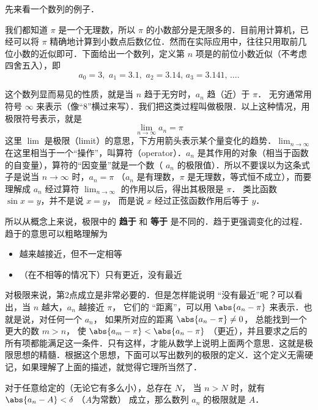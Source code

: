 
先来看一个数列的例子．

\begin{exam}{}
我们都知道 $\pi$ 是一个无理数，所以 $\pi$ 的小数部分是无限多的．目前用计算机，已经可以将 $\pi$ 精确地计算到小数点后数亿位．然而在实际应用中，往往只用取前几位小数的近似即可．下面给出一个数列，定义第 $n$ 项是的前位小数近似（不考虑四舍五入），即
\begin{equation}
{a_0} = 3,\,\,{a_1} = 3.1,\,\,{a_2} = 3.14,\,{a_3} = 3.141,\,\dots.
\end{equation}
\end{exam}

这个数列显而易见的性质，就是当 $n$ 趋于无穷时，$a_n$ 趋（近）于 $\pi$． 无穷通常用符号 $\infty$ 来表示（像“8”横过来写）．我们把这类过程叫做极限．以上这种情况，用极限符号表示，就是
\begin{equation}
\lim_{n \to \infty } {a_n} = \pi 
\end{equation}
这里 $\lim$ 是极限（limit）的意思，下方用箭头表示某个量变化的趋势．$\lim_{n \to \infty }$ 在这里相当于一个“操作”，叫算符（operator）．$a_n$ 是其作用的对象（相当于函数的自变量），算符的“因变量”就是一个数（ $a_n$ 的极限值）．所以不要误以为这条式子是说当 $n \to \infty$ 时，$a_n=\pi$ （$a_n$ 是有理数，$\pi$ 是无理数，等式恒不成立），而要理解成 $a_n$ 经过算符 $\lim_{n \to \infty }$ 的作用以后，得出其极限是 $\pi$． 类比函数 $\sin x = y$，并不是说 $x=y$， 而是说 $x$ 经过正弦函数作用后等于 $y$． 

所以从概念上来说，极限中的 \textbf{趋于} 和 \textbf{等于} 是不同的．趋于更强调变化的过程．趋于的意思可以粗略理解为
\begin{itemize}
\item 越来越接近，但不一定相等
\item （在不相等的情况下）只有更近，没有最近
\end{itemize}

对极限来说，第2点成立是非常必要的．但是怎样能说明 “没有最近”呢？可以看出，当 $n$ 越大，$a_n$ 越接近 $\pi$， 它们的 “距离”，可以用 $\abs{a_n - \pi}$ 来表示．也就是说，对任何一个 $a_n$， 如果所对应的距离 $\abs{a_n - \pi } \ne 0$， 总能找到一个更大的数 $m>n$， 使 $\abs{a_m - \pi} < \abs{a_n - \pi}$ （更近），并且要求之后的所有项都能满足这一条件．只有这样，才能从数学上说明上面两个意思．这就是极限思想的精髓．根据这个思想，下面可以写出数列的极限的定义．这个定义无需硬记，如果理解了上面的描述，就觉得它理所当然了．

对于任意给定的（无论它有多么小），总存在 $N$， 当 $n>N$ 时，就有 $\abs{a_n - A} < \delta $ （$A$为常数） 成立，那么数列 $a_n$ 的极限就是 $A$． 

